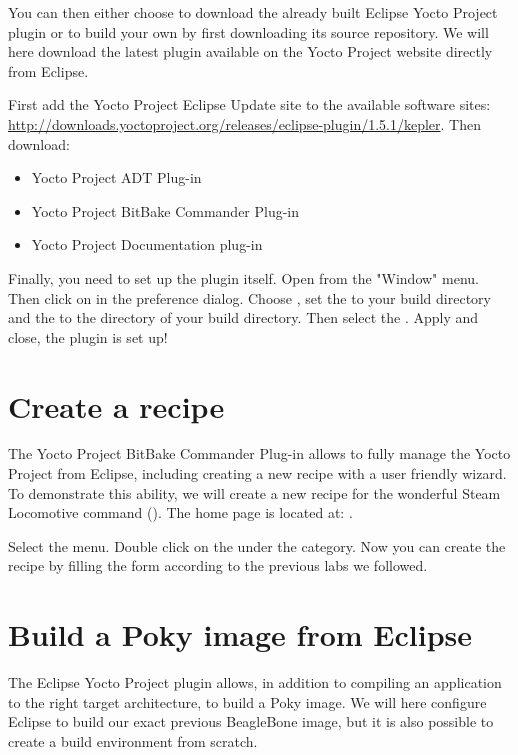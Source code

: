 You can then either choose to download the already built Eclipse Yocto Project
plugin or to build your own by first downloading its source repository. We will
here download the latest plugin available on the Yocto Project website directly
from Eclipse.

First add the Yocto Project Eclipse Update site to the available software sites:
\url{http://downloads.yoctoproject.org/releases/eclipse-plugin/1.5.1/kepler}.
Then download:
\begin{itemize}
  \item Yocto Project ADT Plug-in
  \item Yocto Project BitBake Commander Plug-in
  \item Yocto Project Documentation plug-in
\end{itemize}

Finally, you need to set up the plugin itself. Open  from the
"Window" menu. Then click on  in the preference dialog.
Choose , set the  to your build directory and the  to the
 directory of your build directory. Then select the
. Apply and close, the plugin is set up!

\section{Create a recipe}

The Yocto Project BitBake Commander Plug-in allows to fully manage the Yocto Project
from Eclipse, including creating a new recipe with a user friendly wizard. To
demonstrate this ability, we will create a new recipe for the wonderful Steam
Locomotive command (). The home page is located at:
.

Select the  menu. Double click on the  under the  category. Now you can
create the recipe by filling the form according to the previous labs we
followed.

\section{Build a Poky image from Eclipse}

The Eclipse Yocto Project plugin allows, in addition to compiling an application
to the right target architecture, to build a Poky image. We will here configure
Eclipse to build our exact previous BeagleBone image, but it is also possible to
create a build environment from scratch.

